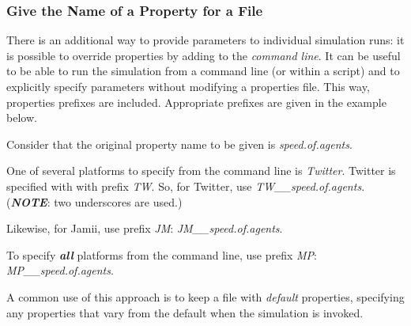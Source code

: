 \subsubsection{Give the Name of a Property for a File}
 There is an additional way to provide parameters to individual simulation runs: it is possible to override properties by adding to the \textit{command line}. It can be useful to be able to run the simulation from a command line (or within a script) and to explicitly specify parameters without modifying a properties file. 
This way, properties prefixes are included. Appropriate prefixes are given in the example below.
 
Consider that the original property name to be given is \textit{speed.of.agents}. 

One of several platforms to specify from the command line is \textit{Twitter}. 
Twitter is specified with with prefix \textit{TW}. 
So, for Twitter, use \textit{TW\_\_speed.of.agents}. (\textbf{\textit{NOTE}}: two underscores are used.)

Likewise, for Jamii, use prefix \textit{JM}: \textit{JM\_\_speed.of.agents}.

 To specify \textit{\textbf{all}} platforms from the command line, use prefix \textit{MP}:
 \textit{\\MP\_\_speed.of.agents}.
 
 
 A common use of this approach is to keep a file with \textit{default} properties, specifying any properties that vary from the default when the simulation is invoked.


